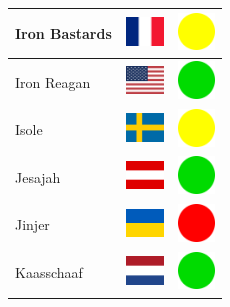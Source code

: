\documentclass[12pt, a4paper, twoside]{report}
\begin{document}
\begin{center}
\begin{longtable}{|p{5cm}|p{2cm}|p{2cm}|}
			Iron Bastards & \includegraphics[width=1cm]{4x3/fr} & \includegraphics[width=1cm]{likes/m} \\ \hline
			Iron Reagan & \includegraphics[width=1cm]{4x3/us} & \includegraphics[width=1cm]{likes/y} \\ \hline
			Isole & \includegraphics[width=1cm]{4x3/se} & \includegraphics[width=1cm]{likes/m} \\ \hline
			Jesajah & \includegraphics[width=1cm]{4x3/at} & \includegraphics[width=1cm]{likes/y} \\ \hline
			Jinjer & \includegraphics[width=1cm]{4x3/ua} & \includegraphics[width=1cm]{likes/n} \\ \hline
			Kaasschaaf & \includegraphics[width=1cm]{4x3/nl} & \includegraphics[width=1cm]{likes/y} \\ \hline

\end{longtable}
\end{center}
\end{document}
